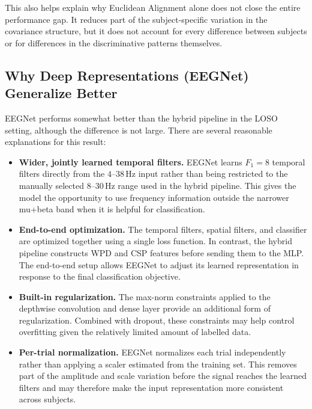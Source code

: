 \documentclass[11pt,a4paper]{article}
\begin{document}
This also helps explain why Euclidean Alignment alone does not close the entire performance
gap. It reduces part of the subject-specific variation in the covariance structure, but it does
not account for every difference between subjects or for differences in the discriminative
patterns themselves.

\subsection{Why Deep Representations (EEGNet) Generalize Better}

EEGNet performs somewhat better than the hybrid pipeline in the LOSO setting, although the
difference is not large. There are several reasonable explanations for this result:

\begin{itemize}[leftmargin=1.2cm]
	\item \textbf{Wider, jointly learned temporal filters.}
	EEGNet learns $F_1=8$ temporal filters directly from the $4$--$38$\,Hz input rather than
	being restricted to the manually selected $8$--$30$\,Hz range used in the hybrid pipeline.
	This gives the model the opportunity to use frequency information outside the narrower
	mu+beta band when it is helpful for classification.
	
	\item \textbf{End-to-end optimization.}
	The temporal filters, spatial filters, and classifier are optimized together using a single
	loss function. In contrast, the hybrid pipeline constructs WPD and CSP features before sending
	them to the MLP. The end-to-end setup allows EEGNet to adjust its learned representation in
	response to the final classification objective.
	
	\item \textbf{Built-in regularization.}
	The max-norm constraints applied to the depthwise convolution and dense layer provide an
	additional form of regularization. Combined with dropout, these constraints may help control
	overfitting given the relatively limited amount of labelled data.
	
	\item \textbf{Per-trial normalization.}
	EEGNet normalizes each trial independently rather than applying a scaler estimated from the
	training set. This removes part of the amplitude and scale variation before the signal reaches
	the learned filters and may therefore make the input representation more consistent across
	subjects.
\end{itemize}
\end{document}

